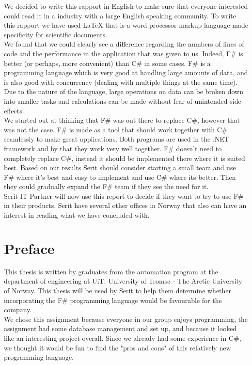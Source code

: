 \documentclass[12pt, a4paper]{article}
\begin{document}
We decided to write this rapport in English to make sure that everyone interested could read it in a industry with a large English speaking community. To write this rapport we have used LaTeX that is a word processor markup language made specificity for scientific documents.\\

We found that we could clearly see a difference regarding the numbers of lines of code and the performance in the application that was given to us. Indeed, F\# is better (or perhaps, more convenient) than C\# in some cases. F\# is a programming language which is very good at handling large amounts of data, and is also good with concurrency (dealing with multiple things at the same time). Due to the nature of the language, large operations on data can be broken down into smaller tasks and calculations can be made without fear of unintended side effects.\\

We started out at thinking that F\# was out there to replace C\#, however that was not the case. F\# is made as a tool that should work together with C\# seamlessly to make great applications. Both programs are used in the .NET framework and by that they work very well together. F\# doesn't need to completely replace C\#, instead it should be implemented there where it is suited best. Based on our results Serit should consider starting a small team and use F\# where it’s best and easy to implement and use C\# where its better. Then they could gradually expand the F\# team if they see the need for it.\\

Serit IT Partner will now use this report to decide if they want to try to use F\# in their products. Serit have several other offices in Norway that also can have an interest in reading what we have concluded with.

\newpage
\section*{Preface}
This thesis is written by graduates from the automation program at the department of engineering  at UiT: University of Tromsø - The Arctic University of Norway. This thesis will be used by Serit to help them determine whether incorporating the F\# programming language would be favourable for the company.\\

We chose this assignment because everyone in our group enjoys programming, the assignment had some database management and set up, and because it looked like an interesting project overall. Since we already had some experience in C\#, we thought it would be fun to find the "pros and cons" of this relatively new programming language.\\
\end{document}
